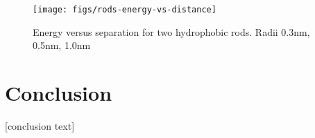 \documentclass[letterpaper,twocolumn,amsmath,amssymb,prb]{revtex4-1}
\begin{document}
\begin{figure}
\begin{center}
\texttt{[image: figs/rods-energy-vs-distance]}
\end{center}
\caption{ Energy versus separation for two hydrophobic rods. Radii 0.3nm, 0.5nm, 1.0nm
 }
\label{fig:rods-energy-vs-distance}
\end{figure}


\section{Conclusion}

[conclusion text]

\end{document}
